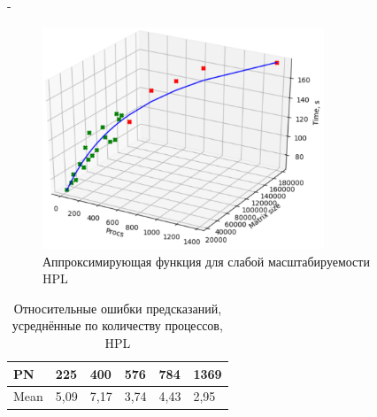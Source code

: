 \documentclass[unicode, t, 11pt]{beamer}%
\newlength{\mylen}
\begin{document}
\begin{frame}
\begin{columns}[T]
\begin{column}{\mylen}
	 			\end{column}
	 			\begin{column}{\dimexpr\textwidth-\mylen}
		 			\begin{figure}
						\captionsetup{font=tiny, labelfont=tiny}
						\includegraphics[width=0.79\textwidth]{./images/aa}%
						\caption{Аппроксимирующая функция для слабой масштабируемости HPL}
						\label{figure_HPL_C_3}
					\end{figure}
		 			\begin{table}
			 			\captionsetup{font=tiny, labelfont=tiny}
			 			\tiny
							\begin{tabularx}{\textwidth}{|X|X|X|X|X|X|}%
								\hline
								  PN &  225 &  400 &  576 &  784 & 1369 \\ \hline
								Mean & 5,09 & 7,17 & 3,74 & 4,43 & 2,95 \\ \hline
							\end{tabularx}
						\caption{Относительные ошибки предсказаний, усреднённые по количеству процессов, HPL}
					\end{table}
				\end{column}
	 		\end{columns}
	 	\end{frame}
\end{document}
